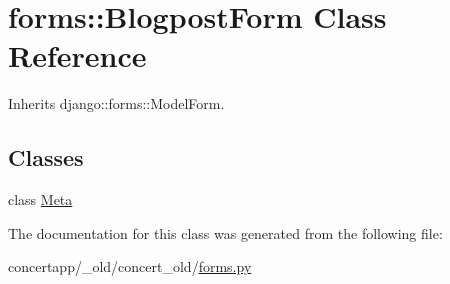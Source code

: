 \hypertarget{classforms_1_1_blogpost_form}{
\section{forms::BlogpostForm Class Reference}
\label{classforms_1_1_blogpost_form}
}


Inherits django::forms::ModelForm.

\subsection*{Classes}
\begin{DoxyCompactItemize}
\item 
class \hyperlink{classforms_1_1_blogpost_form_1_1_meta}{Meta}
\end{DoxyCompactItemize}


The documentation for this class was generated from the following file:\begin{DoxyCompactItemize}
\item 
concertapp/\_\-old/concert\_\-old/\hyperlink{__old_2concert__old_2forms_8py}{forms.py}\end{DoxyCompactItemize}
